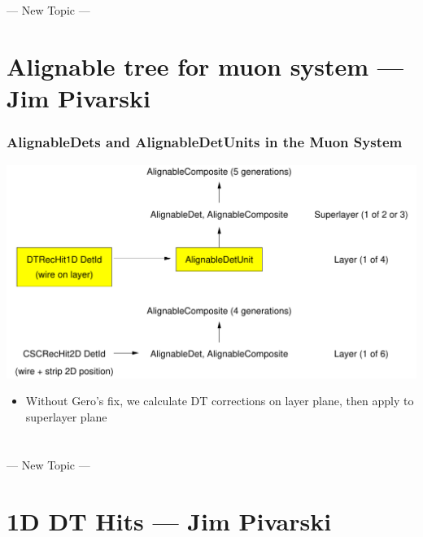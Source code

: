 \documentclass[compress]{beamer}
\begin{document}
\section*{}
\begin{frame}
\Huge
\begin{center}--- New Topic ---\end{center}
\end{frame}

\section*{Alignable tree for muon system --- Jim Pivarski}

\begin{frame}
\frametitle{AlignableDets and AlignableDetUnits in the Muon System}
\begin{center}
\includegraphics[width=0.85\linewidth]{aligabletree}
\end{center}
\begin{itemize}
\item Without Gero's fix, we calculate DT corrections on layer plane, then apply to superlayer plane
\end{itemize}
\end{frame}

\section*{}
\begin{frame}
\Huge
\begin{center}--- New Topic ---\end{center}
\end{frame}

\section*{1D DT Hits --- Jim Pivarski}
\end{document}
